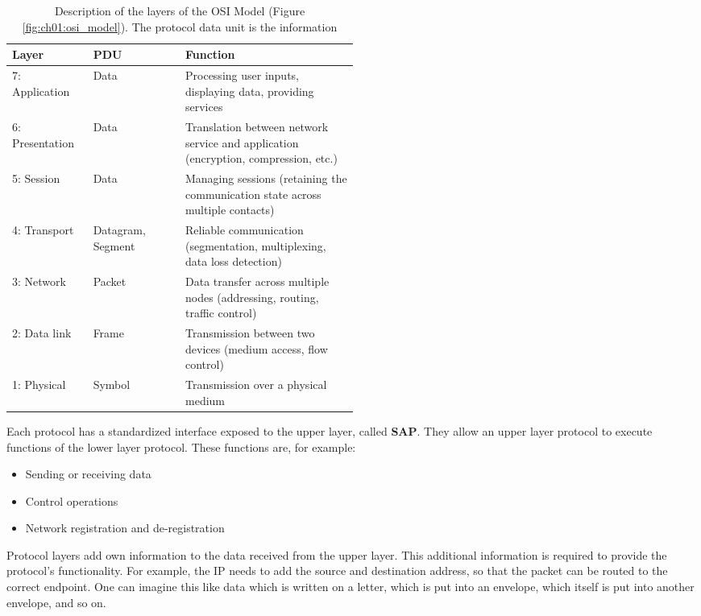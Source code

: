 \begin{table}[H]
	\caption[Description of the layers of the OSI Model]{Description of the layers of the \ac{OSI} Model (Figure \ref{fig:ch01:osi_model}). The protocol data unit is the information }
	\begin{tabular}{|l|l|p{0.5\linewidth}|}
		\hline
		Layer & PDU & Function \\
		\hline
		\hline
		7: Application & Data & Processing user inputs, displaying data, providing services \\
		\hline
		6: Presentation & Data & Translation between network service and application (encryption, compression, etc.) \\
		\hline
		5: Session & Data & Managing sessions (retaining the communication state across multiple contacts) \\
		\hline
		4: Transport & Datagram, Segment & Reliable communication (segmentation, multiplexing, data loss detection) \\
		\hline
		3: Network & Packet & Data transfer across multiple nodes (addressing, routing, traffic control) \\
		\hline
		2: Data link & Frame & Transmission between two devices (medium access, flow control) \\
		\hline
		1: Physical & Symbol & Transmission over a physical medium \\
		\hline
	\end{tabular}
\end{table}

Each protocol has a standardized interface exposed to the upper layer, called  \textbf{\ac{SAP}}. They allow an upper layer protocol to execute functions of the lower layer protocol. These functions are, for example:
\begin{itemize}
	\item Sending or receiving data
	\item Control operations
	\item Network registration and de-registration
\end{itemize}

Protocol layers add own information to the data received from the upper layer. This additional information is required to provide the protocol's functionality. For example, the \acf{IP} needs to add the source and destination address, so that the packet can be routed to the correct endpoint. One can imagine this like data which is written on a letter, which is put into an envelope, which itself is put into another envelope, and so on.

